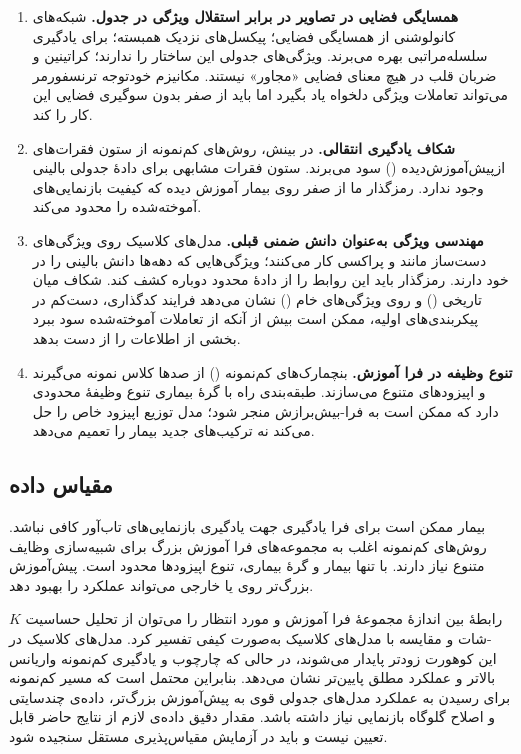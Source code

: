 \begin{enumerate}
\item \textbf{همسایگی فضایی در تصاویر در برابر استقلال ویژگی در جدول.} شبکه‌های کانولوشنی از همسایگی فضایی؛ پیکسل‌های نزدیک همبسته؛ برای یادگیری سلسله‌مراتبی بهره می‌برند. ویژگی‌های جدولی این ساختار را ندارند؛ کراتینین و ضربان قلب در هیچ معنای فضایی «مجاور» نیستند. مکانیزم خودتوجه ترنسفورمر می‌تواند تعاملات ویژگی دلخواه یاد بگیرد اما باید از صفر بدون سوگیری فضایی این کار را کند.
\item \textbf{شکاف یادگیری انتقالی.} در بینش، روش‌های کم‌نمونه از ستون فقرات‌های ازپیش‌آموزش‌دیده () سود می‌برند. ستون فقرات مشابهی برای دادۀ جدولی بالینی وجود ندارد. رمزگذار  ما از صفر روی  بیمار آموزش دیده که کیفیت بازنمایی‌های آموخته‌شده را محدود می‌کند.
\item \textbf{مهندسی ویژگی به‌عنوان دانش ضمنی قبلی.} مدل‌های کلاسیک روی ویژگی‌های دست‌ساز مانند  و پراکسی  کار می‌کنند؛ ویژگی‌هایی که دهه‌ها دانش بالینی را در خود دارند. رمزگذار  باید این روابط را از دادۀ محدود دوباره کشف کند. شکاف میان  تاریخی () و  روی ویژگی‌های خام () نشان می‌دهد فرایند کدگذاری، دست‌کم در پیکربندی‌های اولیه، ممکن است بیش از آنکه از تعاملات آموخته‌شده سود ببرد بخشی از اطلاعات را از دست بدهد.
\item \textbf{تنوع وظیفه در فرا آموزش.} بنچمارک‌های کم‌نمونه () از صدها کلاس نمونه می‌گیرند و اپیزودهای متنوع می‌سازند. طبقه‌بندی راه با  گرۀ بیماری تنوع وظیفۀ محدودی دارد که ممکن است به فرا-بیش‌برازش منجر شود؛ مدل توزیع اپیزود خاص را حل می‌کند نه ترکیب‌های جدید بیمار را تعمیم می‌دهد.
\end{enumerate}

\subsection{مقیاس داده}

 بیمار ممکن است برای فرا یادگیری جهت یادگیری بازنمایی‌های تاب‌آور کافی نباشد. روش‌های کم‌نمونه اغلب به مجموعه‌های فرا آموزش بزرگ برای شبیه‌سازی وظایف متنوع نیاز دارند. با تنها  بیمار و  گرۀ بیماری، تنوع اپیزودها محدود است. پیش‌آموزش بزرگ‌تر روی  یا  خارجی می‌تواند عملکرد را بهبود دهد.

رابطۀ بین اندازۀ مجموعۀ فرا آموزش و  مورد انتظار را می‌توان از تحلیل حساسیت $K$-شات و مقایسه با مدل‌های کلاسیک به‌صورت کیفی تفسیر کرد. مدل‌های کلاسیک در این کوهورت زودتر پایدار می‌شوند، در حالی که چارچوب  و یادگیری کم‌نمونه واریانس بالاتر و عملکرد مطلق پایین‌تر نشان می‌دهد. بنابراین محتمل است که مسیر کم‌نمونه برای رسیدن به عملکرد مدل‌های جدولی قوی به پیش‌آموزش بزرگ‌تر، داده‌ی چندسایتی و اصلاح گلوگاه بازنمایی نیاز داشته باشد. مقدار دقیق داده‌ی لازم از نتایج حاضر قابل تعیین نیست و باید در آزمایش مقیاس‌پذیری مستقل سنجیده شود.

